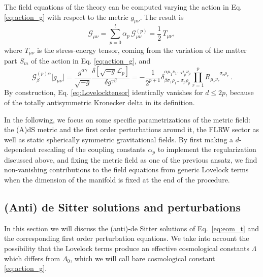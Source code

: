 \documentclass[aps,prd,preprint,nofootinbib]{revtex4-1}
\begin{document}
The field equations of the theory can be computed varying the action in Eq. \eqref{eq:action_g} with respect to the metric $g_{\mu \nu}$. The result is
\begin{equation}
\mathcal{G}_{\mu \nu} = \sum_{p=0}^t \alpha_p \, \mathcal{G}^{(p)}_{\mu\nu} = \frac{1}{2}\, T_{\mu\nu},
\label{eq:eom_t}
\end{equation}
where $T_{\mu\nu}$ is the stress-energy tensor, coming from the variation of the matter part $S_m$ of the action in Eq. \eqref{eq:action_g}, and 
\begin{equation}
\label{eq:Lovelocktensor}
\mathcal{G}_\beta^{(p) \alpha}\big[g_{\mu\nu} \big]  = \frac{g^{\alpha\gamma}}{\sqrt{-g}}\frac{ \delta\left[\sqrt{-g} \mathcal{L}_p \right]}{\delta g^{\gamma\beta}} =  -\frac{1}{2^{p+1}} \delta^{\alpha \mu_1 \nu_1 \dots \mu_p \nu_p}_{\beta \sigma_1 \rho_1 \dots \sigma_p \rho_p}\prod  _{r=1}^p R^{\phantom{\mu_r \nu_r} \sigma_r \rho_r}_{\mu_r \nu_r} \, .
\end{equation} 
By construction, Eq. \eqref{eq:Lovelocktensor} identically vanishes for $d \leq 2p$, because of the totally antisymmetric Kronecker delta in its definition. 


In the following, we focus on some specific parametrizations of the metric field: the (A)dS metric and the first order perturbations around it, the FLRW sector as well as static spherically symmetric gravitational fields. By first making a $d$-dependent rescaling of the coupling constants $\alpha_p$ to implement the  regularization discussed above, and fixing the metric field as one of the previous ansatz, we find non-vanishing contributions to the field equations from generic Lovelock terms when the dimension of the manifold is fixed at the end of the procedure.


\subsection{(Anti) de Sitter solutions and perturbations}\label{sec:AdeSitter}

In this section we will discuss the (anti)-de Sitter solutions of Eq.\ \eqref{eq:eom_t} and the corresponding first order perturbation equations. We  take into account the possibility that the Lovelock terms produce an effective cosmological constants $\Lambda$ which differs from  $\Lambda_0$, which we will call bare cosmological constant \eqref{eq:action_g}.
\end{document}
